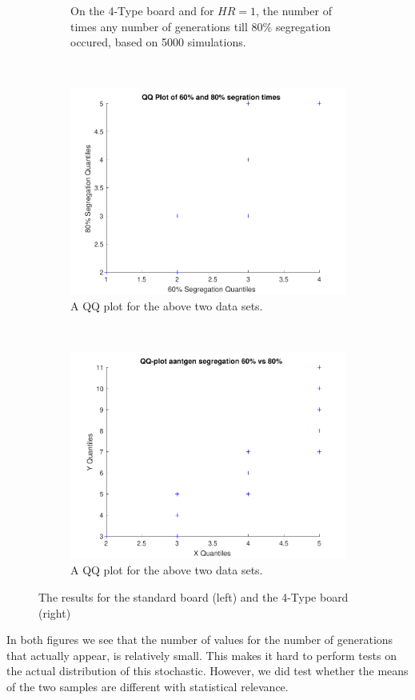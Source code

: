 \begin{figure}[H]
\begin{subfigure}{0.45\textwidth}
    \caption{On the 4-Type board and for $HR=1$, the number of times any number of generations till $80\%$ segregation occured, based on 5000 simulations.}
    \label{fig:segaantgen_480}
\end{subfigure}
~
\begin{subfigure}{0.45\textwidth}
    \centering
    \includegraphics[width=\textwidth]{./60_80_segregation_aantgen/60_80_QQ_plot.pdf}
    \caption{A QQ plot for the above two data sets.}
    \label{fig:qqplotsegaantgen_s}
\end{subfigure}
~
\begin{subfigure}{0.45\textwidth}
    \centering
    \includegraphics[width=\textwidth]{./60_80_segregation_aantgen/4TypeBoard/60_80_QQ_plot.pdf}
    \caption{A QQ plot for the above two data sets.}
    \label{fig:qqplotsegaantgen_4}
\end{subfigure}
\caption{The results for the standard board (left) and the 4-Type board (right)}
\end{figure}
In both figures we see that the number of values for the number of generations that actually appear, is relatively small. This makes it hard to perform tests on the actual distribution of this stochastic. However, we did test whether the means of the two samples are different with statistical relevance.\\

